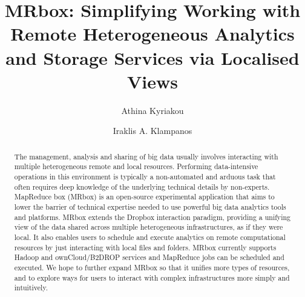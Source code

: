 \documentclass[sigconf,edbt]{acmart-edbt2021}
\begin{document}
\title{MRbox: Simplifying Working with Remote Heterogeneous Analytics and Storage Services via Localised Views}

\author{Athina Kyriakou}

\author{Iraklis A. Klampanos}

\begin{abstract}
The management, analysis and sharing of big data usually involves interacting with multiple heterogeneous remote and local resources. Performing data-intensive operations in this environment is typically a non-automated and arduous task that often requires deep knowledge of the underlying technical details by non-experts. MapReduce box (MRbox) is an open-source experimental application that aims to lower the barrier of technical expertise needed to use powerful big data analytics tools and platforms. MRbox extends the Dropbox interaction paradigm, providing a unifying view of the data shared across multiple heterogeneous infrastructures, as if they were local. It also enables users to schedule and execute analytics on remote computational resources by just interacting with local files and folders. MRbox currently supports Hadoop and ownCloud/B2DROP services and MapReduce jobs can be scheduled and executed. We hope to further expand MRbox so that it unifies more types of resources, and to explore ways for users to interact with complex infrastructures more simply and intuitively.
\end{abstract}

\maketitle





\end{document}
